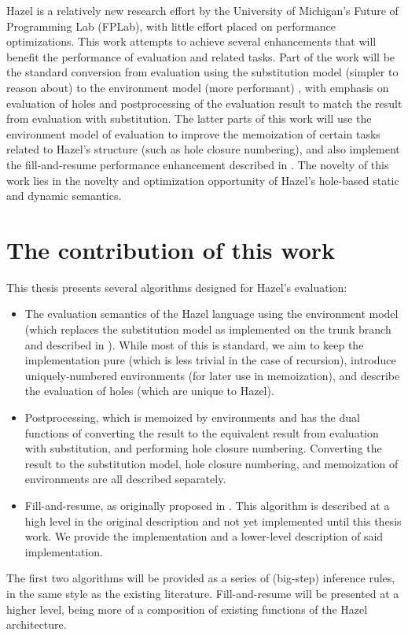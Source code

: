 Hazel is a relatively new research effort by the University of Michigan's Future of Programming Lab (FPLab), with little effort placed on performance optimizations. This work attempts to achieve several enhancements that will benefit the performance of evaluation and related tasks. Part of the work will be the standard conversion from evaluation using the substitution model (simpler to reason about) to the environment model (more performant) , with emphasis on evaluation of holes and postprocessing of the evaluation result to match the result from evaluation with substitution. The latter parts of this work will use the environment model of evaluation to improve the memoization of certain tasks related to Hazel's structure (such as hole closure numbering), and also implement the fill-and-resume performance enhancement described in \cite{conf/popl/HazelnutLive19}. The novelty of this work lies in the novelty and optimization opportunity of Hazel's hole-based static and dynamic semantics.

\section{The contribution of this work}
\label{sec:contribution}

This thesis presents several algorithms designed for Hazel's evaluation:
\begin{itemize}
\item The evaluation semantics of the Hazel language using the environment model (which replaces the substitution model as implemented on the trunk branch and described in \cite{conf/popl/HazelnutLive19}). While most of this is standard, we aim to keep the implementation pure (which is less trivial in the case of recursion), introduce uniquely-numbered environments (for later use in memoization), and describe the evaluation of holes (which are unique to Hazel).
\item Postprocessing, which is memoized by environments and has the dual functions of converting the result to the equivalent result from evaluation with substitution, and performing hole closure numbering. Converting the result to the substitution model, hole closure numbering, and memoization of environments are all described separately.
\item Fill-and-resume, as originally proposed in \cite{conf/popl/HazelnutLive19}. This algorithm is described at a high level in the original description and not yet implemented until this thesis work. We provide the implementation and a lower-level description of said implementation.
\end{itemize}
The first two algorithms will be provided as a series of (big-step) inference rules, in the same style as the existing literature. Fill-and-resume will be presented at a higher level, being more of a composition of existing functions of the Hazel architecture.

